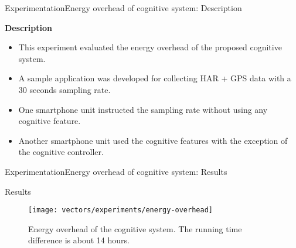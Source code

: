 \begin{frame}{Experimentation}{Energy overhead of cognitive system: Description}
\small
\begin{block}{\small \textbf{Description}}
\begin{itemize}
  \item This experiment evaluated the energy overhead of the proposed cognitive system.
  \item A sample application was developed for collecting HAR + GPS data with a 30 seconds sampling rate.
  \item One smartphone unit instructed the sampling rate without using any cognitive feature.
  \item Another smartphone unit used the cognitive features with the exception of the cognitive controller.
\end{itemize}
\end{block}


\begin{table}
\centering
\renewcommand{\arraystretch}{0.8}
\caption{Input parameters for the energy overhead measurement experiment (Geofencing and Stay Points Detector enabled only in one smartphone).}
\label{tab:exp-7-input-parameters}
\end{table}
\end{frame}

\begin{frame}{Experimentation}{Energy overhead of cognitive system: Results}
\small
\begin{block}{Results}
\begin{figure}
  \texttt{[image: vectors/experiments/energy-overhead]}
  \caption{Energy overhead of the cognitive system. The running time difference is about 14 hours.}
\end{figure}
\end{block}
\end{frame}
